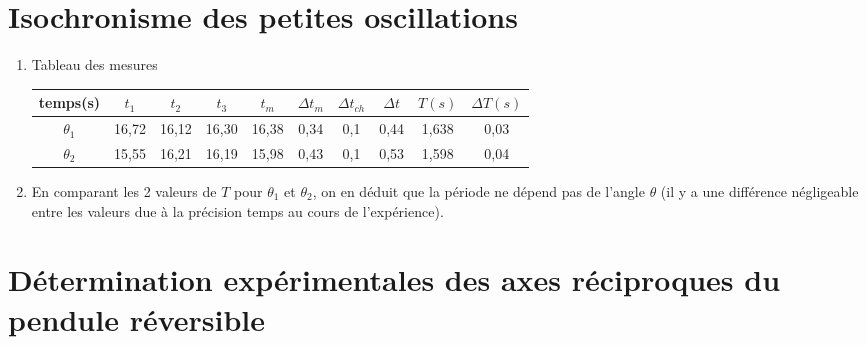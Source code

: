 \documentclass[a4paper,12pt]{article}
\begin{document}
\section{Isochronisme des petites oscillations}
\begin{enumerate}
    \item Tableau des mesures  
\begin{table}[H]
    \centering
    \renewcommand{\arraystretch}{1.5}
    \begin{tabular}{|c|c|c|c|c|c|c|c|c|c|}
    \hline
    temps(s) & $t_1$ & $t_2$ & $t_3$ & $t_m$ & $\Delta t_m$ & $\Delta t_{ch}$ & $\Delta t$ & $T(s)$ & $\Delta T(s)$ \\
    \hline
    $\theta_1$ & 16,72 & 16,12 & 16,30 & 16,38 & 0,34 & 0,1 & 0,44 & 1,638 & 0,03 \\
    \hline
    $\theta_2$ & 15,55 & 16,21 & 16,19 & 15,98 & 0,43 & 0,1 & 0,53 & 1,598 & 0,04 \\
    \hline
    \end{tabular}
\end{table}

    \item
En comparant les 2 valeurs de $T$ pour $\theta_1$ et $\theta_2$, on en déduit que la période ne dépend pas de l'angle $\theta$ (il y a une différence négligeable entre les valeurs due à la précision temps au cours de l'expérience).


\end{enumerate}
\section{Détermination expérimentales des axes réciproques du pendule réversible}
\end{document}
